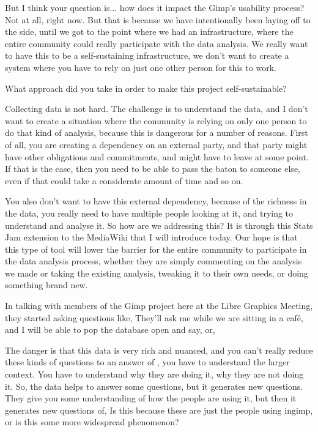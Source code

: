 {But I think your question is... how does it impact the Gimp's usability
process? Not at all, right now. But that is because we have
intentionally been laying off to the side, until we got to the point
where we had an infrastructure, where the entire community could really
participate with the data analysis. We really want to have this to be a
self{}-sustaining infrastructure, we don't want to create a system
where you have to rely on just one other person for this to work.\par

 What approach did you take in order to make this project
self{}-sustainable?\par

 Collecting data is not hard. The challenge is to understand the
data, and I don't want to create a situation where the community is
relying on only one person to do that kind of analysis, because this is
dangerous for a number of reasons. First of all, you are creating a
dependency on an external party, and that party might have other
obligations and commitments, and might have to leave at some point. If
that is the case, then you need to be able to pass the baton to someone
else, even if that could take a considerate amount of time and so on.\par

You also don't want to have this external dependency, because of the
richness in the data, you really need to have multiple people looking
at it, and trying to understand and analyse it. So how are we
addressing this? It is through this Stats Jam extension to the
MediaWiki that I will introduce today. Our hope is that this type of
tool will lower the barrier for the entire community to participate in
the data analysis process, whether they are simply commenting on the
analysis we made or taking the existing analysis, tweaking it to their
own needs, or doing something brand new.\par 

In talking with members of the Gimp project here at the Libre Graphics
Meeting, they started asking questions like,  They'll
ask me while we are sitting in a caf\'e, and I will be able to pop the
database open and say,  or,
\par 

The danger is that this data is very rich and nuanced, and you can't
really reduce these kinds of questions to an answer of , you have to understand the larger context. You have to
understand why they are doing it, why they are not doing it. So, the
data helps to answer some questions, but it generates new questions.
They give you some understanding of how the people are using it, but
then it generates new questions of,  Is this
because these are just the people using ingimp, or is this some more
widespread phenomenon?\par

}
